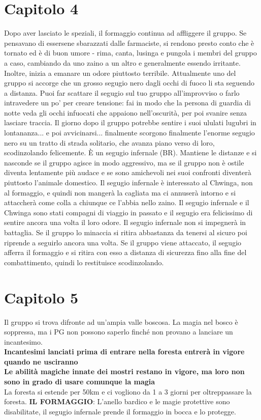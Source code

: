 \documentclass{article}
\begin{document}
\section{Capitolo 4}
Dopo aver lasciato le speziali, il formaggio continua ad affliggere il gruppo.
Se pensavano di essersene sbarazzati dalle farmaciste, si rendono presto conto che è tornato ed è di buon umore - rima, canta, lusinga e pungola i membri del gruppo a caso, cambiando da uno zaino a un altro e generalmente essendo irritante. Inoltre, inizia a emanare un odore piuttosto terribile.
Attualmente uno del gruppo si accorge che un grosso segugio nero dagli occhi di fuoco li sta seguendo a distanza.
Puoi far scattare il segugio sul tuo gruppo all'improvviso o farlo intravedere un po' per creare tensione: fai in modo che la persona di guardia di notte veda gli occhi infuocati che appaiono nell'oscurità, per poi svanire senza lasciare traccia. Il giorno dopo il gruppo potrebbe sentire i suoi ululati lugubri in lontananza... e poi avvicinarsi... finalmente scorgono finalmente l'enorme segugio nero su un tratto di strada solitario, che avanza piano verso di loro, scodinzolando felicemente.
È un segugio infernale (BR). Mantiene le distanze e si nasconde se il gruppo agisce in modo aggressivo, ma se il gruppo non è ostile diventa lentamente più audace e se sono amichevoli nei suoi confronti diventerà piuttosto l'animale domestico.
Il segugio infernale è interessato al Chwinga, non al formaggio, e quindi non mangerà la cagliata ma ci annuserà intorno e si attaccherà come colla a chiunque ce l'abbia nello zaino.
Il segugio infernale e il Chwinga sono stati compagni di viaggio in passato e il segugio era felicissimo di sentire ancora una volta il loro odore.
Il segugio infernale non si impegnerà in battaglia. Se il gruppo lo minaccia si ritira abbastanza da tenersi al sicuro poi riprende a seguirlo ancora una volta.
Se il gruppo viene attaccato, il segugio afferra il formaggio e si ritira con esso a distanza di sicurezza fino alla fine del combattimento, quindi lo restituisce scodinzolando.

\section{Capitolo 5}
Il gruppo si trova difronte ad un'ampia valle boscosa. La magia nel bosco è soppressa, ma i PG non possono saperlo finché non provano a lanciare un incantesimo. \\
\textbf{Incantesimi lanciati prima di entrare nella foresta entrerà in vigore quando ne usciranno}\\
\textbf{Le abilità magiche innate dei mostri restano in vigore, ma loro non sono in grado di usare comunque la magia}\\
La foresta si estende per 50km e ci vogliono da 1 a 3 giorni per oltreppassare la foresta.
\textbf{IL FORMAGGIO}: L'anello bardico e le magie protettive sono disabilitate, il segugio infernale prende il formaggio in bocca e lo protegge.
\end{document}
